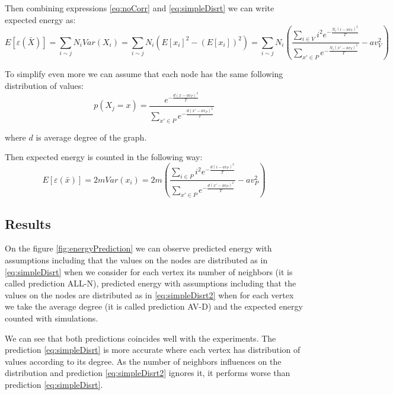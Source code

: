 \documentclass[12pt]{report}
\begin{document}
Then combining expressions \ref{eq:noCorr} and \ref{eq:simpleDisrt} we can write expected energy as:
$$ E[\varepsilon (\bar{X})] =  \sum_{i \sim j} N_iVar(X_i) =
\sum_{i \sim j} N_i  \left(E[x_i]^2 - (E[x_i])^2\right) =
\sum_{i \sim j} N_i \left(\frac{ \sum\limits_{i\in V} i^2 e^{- \frac{N_i(i - av_V)^2}{T}} }{ \sum\limits_{x'\in P} e^{-\frac{N_i(x' - av_V)^2}{T}}} - av_V^2\right)
$$

To simplify even more we can assume that each node has the same following distribution of values:
\begin{equation}
\label{eq:simpleDisrt2}
p(X_j = x) = 
\frac{ e^{-\frac{d(x - av_P)^2}{T}} }{ \sum\limits_{x'\in P} e^{-\frac{d(x' - av_P)^2}{T}}}
\end{equation}

where $d$ is average degree of the graph. 

Then expected energy is counted in the following way:
$$ E[\varepsilon (\bar{x})] = 2mVar(x_i)  = 2m\left(\frac{ \sum\limits_{i\in P} i^2 e^{- \frac{d(i - av_P)^2}{T}} }{ \sum\limits_{x'\in P} e^{-\frac{d(x' - av_P)^2}{T}}} - av_P^2\right)$$


\subsection{Results}

On the figure \ref{fig:energyPrediction} we can observe predicted energy with assumptions including that the values on the nodes are distributed as in \ref{eq:simpleDisrt} when we consider for each vertex its number of neighbors (it is called prediction ALL-N), predicted energy with assumptions including that the values on the nodes are distributed as in \ref{eq:simpleDisrt2} when for each vertex we take the average degree (it is called prediction AV-D) and the expected energy counted with simulations.

We can see that both predictions coincides well with the experiments. The prediction \ref{eq:simpleDisrt} is more accurate where each vertex has distribution of values according to its degree. As the number of neighbors influences on the distribution and prediction \ref{eq:simpleDisrt2} ignores it, it performs worse than prediction \ref{eq:simpleDisrt}.
\end{document}
